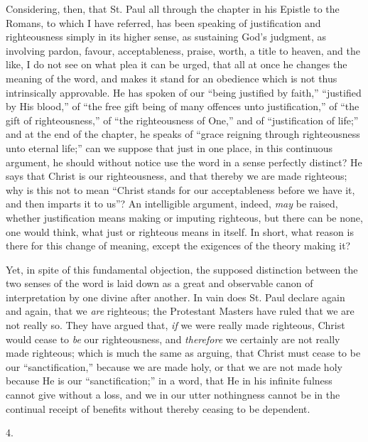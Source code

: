 Considering, then, that St. Paul all through the chapter in his
Epistle to the Romans, to which I have referred, has been speaking of
justification and righteousness simply in its higher sense, as
sustaining God's judgment, as involving pardon, favour,
acceptableness, praise, worth, a title to heaven, and the like, I do
not see on what plea it can be urged, that all at once he changes the
meaning of the word, and makes it stand for an obedience which is not
thus intrinsically approvable. He has spoken of our ``being
justified by faith,'' ``justified by His blood,'' of
``the free gift being of many offences unto justification,''
of ``the gift of righteousness,'' of ``the righteousness
of One,'' and of ``justification of life;'' and at
the end of the chapter, he speaks of ``grace reigning through
righteousness unto eternal life;'' can we suppose that just in one
place, in this continuous argument, he should without notice use the
word in a sense perfectly distinct? He says that Christ is our
righteousness, and that thereby we are made righteous; why is this not
to mean ``Christ stands for our acceptableness before we have it,
and then imparts it to us''? An intelligible argument, indeed, \emph{may}
be raised, whether justification means making or imputing righteous,
but there can be none, one would think, what just or righteous means
in itself. In short, what reason is there for this change of meaning,
except the exigences of the theory making it?

Yet, in spite of this fundamental objection, the supposed
distinction between the two senses of the word is laid down as a great
and observable canon of interpretation by one divine after another. In
vain does St. Paul declare again and again, that we \emph{are}
righteous; the Protestant Masters have ruled that we are not really
so. They have argued that, \emph{if} we were really made righteous,
Christ would cease to \emph{be} our righteousness, and \emph{therefore}
we certainly are not really made righteous; which is much the same as
arguing, that Christ must cease to be our ``sanctification,''
because we are made holy, or that we are not made holy because He is
our ``sanctification;'' in a word, that He in his infinite
fulness cannot give without a loss, and we in our utter nothingness
cannot be in the continual receipt of benefits without thereby ceasing
to be dependent.

4.

